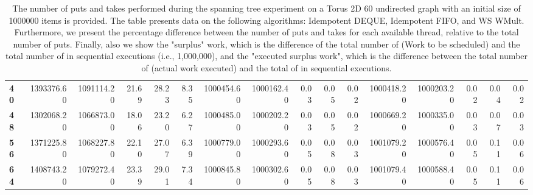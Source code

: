 \begin{table}[!ht]
{\begin{tabular}{lrrrrrrrrrrrrrrr}
\textbf{40} &       1393376.60 & 1091114.20 &          21.69 &       28.23 &                 8.35 &      1000454.60 & 1000162.40 &           0.03 &        0.05 &                 0.02 & 1000418.20 & 1000203.20 &           0.02 &        0.04 &                 0.02 \\
\textbf{48} &       1302068.20 & 1066873.00 &          18.06 &       23.20 &                 6.27 &      1000485.00 & 1000202.20 &           0.03 &        0.05 &                 0.02 & 1000669.20 & 1000335.00 &           0.03 &        0.07 &                 0.03 \\
\textbf{56} &       1371225.80 & 1068227.80 &          22.10 &       27.07 &                 6.39 &      1000779.00 & 1000293.60 &           0.05 &        0.08 &                 0.03 & 1001079.20 & 1000576.40 &           0.05 &        0.11 &                 0.06 \\
\textbf{64} &       1408743.20 & 1079272.40 &          23.39 &       29.01 &                 7.34 &      1000845.80 & 1000302.60 &           0.05 &        0.08 &                 0.03 & 1001079.40 & 1000588.40 &           0.05 &        0.11 &                 0.06 \\
\bottomrule
\end{tabular}}
\label{difference-Torus_2D_60_undirected-1000000-IDEMPOTENT_DEQUE-IDEMPOTENT_FIFO-WS_NC_MULT_OPT}
\caption{The number of puts and takes performed during the
    spanning tree experiment on a Torus 2D 60 undirected graph with an initial size
    of 1000000 items is provided. The table presents data on the
    following algorithms: Idempotent DEQUE, Idempotent FIFO, and
    WS WMult. Furthermore, we present the percentage difference
    between the number of puts and takes for each available thread,
    relative to the total number of puts. Finally, also we show the
    "surplus" work, which is the difference of the total number of
    \Puts (Work to be scheduled) and the total number of \Puts in
    sequential executions (i.e., 1,000,000), and the "executed surplus
    work", which is the difference between the total number of \Takes
    (actual work executed) and the total of \Takes in sequential
    executions.}
\end{table}
